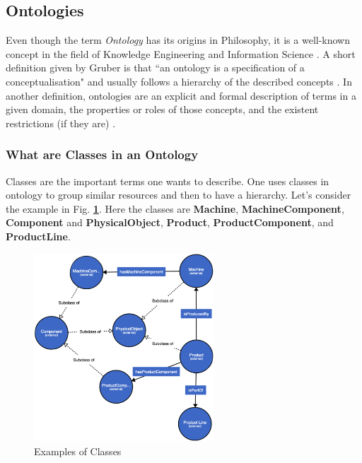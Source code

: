 \documentclass{guideline/sty/rapport}
\begin{document}

\subsection{Ontologies}
\label{sec:ontologies}
Even though the term \textit{Ontology} has its origins in Philosophy, it is a well-known concept in the field of Knowledge Engineering and Information Science \cite{Peng13}. A short definition given by Gruber \cite{Gruber93} is that ``an ontology is a specification of a conceptualisation" and usually follows a hierarchy of the described concepts \cite{Kalfoglou05}. In another definition, ontologies are an explicit and formal description of terms in a given domain, the properties or roles of those concepts, and the existent restrictions (if they are) \cite{Noy01,Peng13}. \singlespacing

\subsubsection{What are Classes in an Ontology}
\label{sec:classesontologies}

Classes are the important terms one wants to describe. One uses classes in ontology to group similar resources and then to have a hierarchy. Let's consider the example in Fig. \textbf{\ref{fig:exampleclasses}}. Here the classes are \textbf{Machine}, \textbf{MachineComponent}, \textbf{Component} and \textbf{PhysicalObject}, \textbf{Product}, \textbf{ProductComponent}, and \textbf{ProductLine}. 

  \begin{figure}[H]
        \centering
          \includegraphics[width=0.6\textwidth]{images/classesexample.png}
          \caption{Examples of Classes}
    \label{fig:exampleclasses}
    \end{figure}
\end{document}
